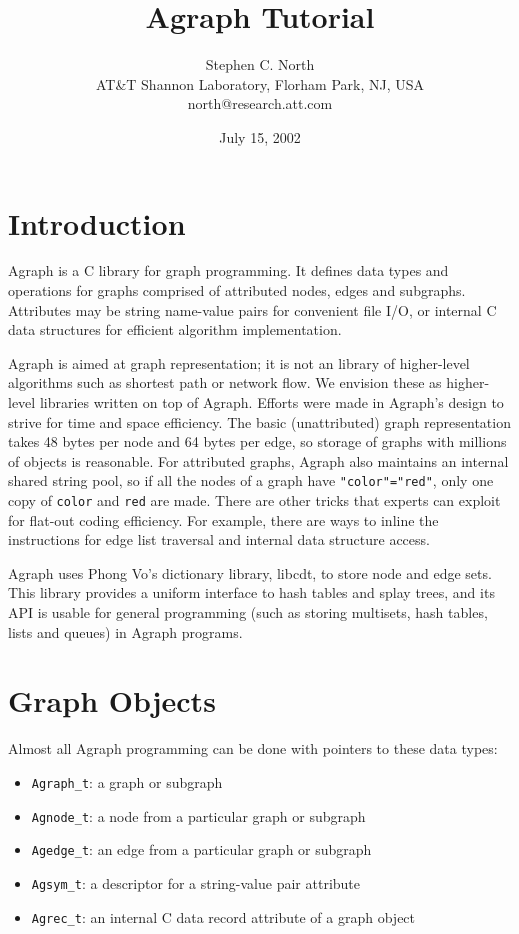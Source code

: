 \documentclass[11pt,letterpaper]{article}
\author{Stephen C. North\\
{\small AT\&T Shannon Laboratory, Florham Park, NJ, USA}\\
{\small north@research.att.com}
}
\title{Agraph Tutorial}
\date{July 15, 2002}
\begin{document}
\maketitle  

\section{Introduction}
\label{sec:introduction}
Agraph is a C library for graph programming.
It defines data types and operations for graphs comprised
of attributed nodes, edges and subgraphs.
Attributes may be string name-value pairs for convenient
file I/O, or internal C data structures for efficient algorithm
implementation.

Agraph is aimed at graph representation; it is not an library of
higher-level algorithms such as shortest path or network flow.
We envision these as higher-level libraries written on top of
Agraph.  Efforts were made in Agraph's design to strive
for time and space efficiency.  The basic (unattributed) graph representation
takes 48 bytes per node and 64 bytes per edge, so storage of graphs with
millions of objects is reasonable.  For attributed graphs, Agraph also
maintains an internal shared string pool, so if all the nodes of a graph
have \verb'"color"="red"', only one copy of \verb"color" and \verb"red"
are made.  There are other tricks that experts can exploit for
flat-out coding efficiency.  For example, there are ways to inline the
instructions for edge list traversal and internal data structure access.

Agraph uses Phong Vo's dictionary library, libcdt, to store node
and edge sets.  This library provides a uniform interface to hash
tables and splay trees, and its API is usable for general programming
(such as storing  multisets, hash tables, lists and queues) in Agraph
programs.

\section{Graph Objects}
\label{sec:graphobjects}
Almost all Agraph programming can be done with pointers to
these data types:

\begin{itemize}
\item \verb"Agraph_t": a graph or subgraph
\item \verb"Agnode_t": a node from a particular graph or subgraph
\item \verb"Agedge_t": an edge from a particular graph or subgraph
\item \verb"Agsym_t": a descriptor for a string-value pair attribute
\item \verb"Agrec_t": an internal C data record attribute of a graph object
\end{itemize}
\end{document}
